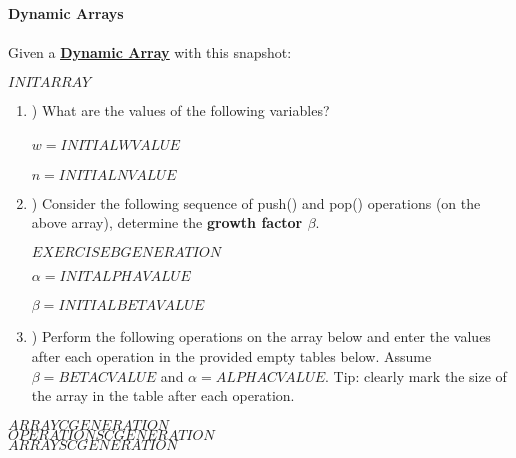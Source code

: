     \textbf{\LARGE{\color{tumgadRed} Dynamic Arrays}}\\
    \\
    \noindent
    Given a \href{https://sebastianoner.github.io/TUMGAD/src/DataStructures/Sequences/Arrays/Arrays}{\textbf{\underline{Dynamic Array}}} with this snapshot:
    \begin{center}
        $INITARRAY$
    \end{center}
    \begin{enumerate}[label=\alph*]
        \item \hspace{-5px}) What are the values of the following variables?\\
        \\
        \color{tumgadRed}
        $w = INITIALWVALUE$\\
        \\
        $n = INITIALNVALUE$
        \\
        \color{black}
        \item \hspace{-5px}) Consider the following sequence of push() and pop() operations (on the above array), determine the \textbf{growth factor $\beta$}.
        \begin{center}
            $EXERCISEBGENERATION$
        \end{center}
        \color{tumgadRed}
        $\alpha = INITALPHAVALUE$\\
        \\
        $\beta = INITIALBETAVALUE$\\
        \color{black}
        \item \hspace{-5px}) Perform the following operations on the array below and enter the values after each operation in the provided empty
        tables below. Assume $\beta = BETACVALUE$ and $\alpha = ALPHACVALUE$. Tip: clearly mark the size of the array in the table after each operation.
    \end{enumerate}
    \begin{center}
        $ARRAYCGENERATION$\\
        \color{tumgadRed}
        $OPERATIONSCGENERATION$\\
        $ARRAYSCGENERATION$
        \color{black}
    \end{center}
